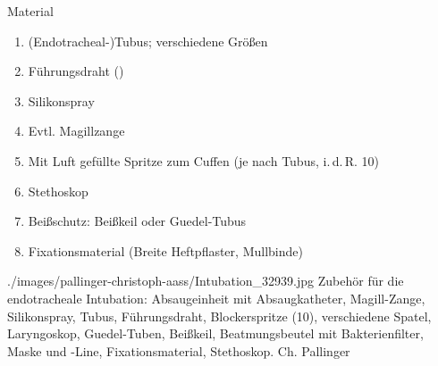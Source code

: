 \begin{ProcedureStepsWide}{Material}
\begin{enumerate}
\begin{minipage}{\linewidth}
\end{minipage}
    \item (Endotracheal-)Tubus; verschiedene Größen
    \item Führungsdraht ()
    \item Silikonspray
    \item Evtl. Magillzange
    \item Mit Luft gefüllte Spritze zum Cuffen (je
    nach Tubus, i.\,d.\,R. 10\Ml*)
    \item Stethoskop
    \item Beißschutz: Beißkeil oder Guedel-Tubus
    \item Fixationsmaterial (Breite Heftpflaster, Mullbinde)
\end{enumerate}


\end{ProcedureStepsWide}








{}
{}
{./images/pallinger-christoph-aass/Intubation_32939.jpg}
{Zubehör für die endotracheale Intubation: Absaugeinheit
mit Absaugkatheter, Magill-Zange, Silikonspray, Tubus,
Führungsdraht, Blockerspritze (10\Ml*), verschiedene Spatel,
Laryngoskop, Guedel-Tuben, Beißkeil, Beatmungsbeutel mit
Bakterienfilter, Maske und -Line, Fixationsmaterial,
Stethoskop.}
{Ch.
Pallinger}

\clearpage




